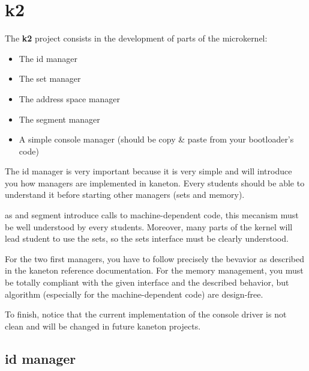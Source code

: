 
%
%

\section{k2}

The \textbf{k2} project consists in the development of parts of
the microkernel:

\begin{itemize}
  \item
    The id manager
  \item
    The set manager
  \item
    The address space manager
  \item
    The segment manager
  \item
    A  simple  console manager  (should  be  copy  \& paste  from  your
    bootloader's code)
\end{itemize}

The id  manager is very important  because it is very  simple and will
introduce you how managers  are implemented in kaneton. Every students
should be able  to understand it before starting  other managers (sets
and memory).

as  and  segment  introduce  calls  to  machine-dependent  code,  this
mecanism  must be well  understood by  every students.  Moreover, many
parts of  the kernel will  lead student to  use the sets, so  the sets
interface must be clearly understood.

For the two first managers,  you have to follow precisely the bevavior
as described  in the kaneton  reference documentation. For  the memory
management, you must be totally compliant with the given interface and
the   described   behavior,   but   algorithm  (especially   for   the
machine-dependent code) are design-free.

To  finish, notice  that  the current  implementation  of the  console
driver is not clean and will be changed in future kaneton projects.

%
%

\subsection{id manager}

